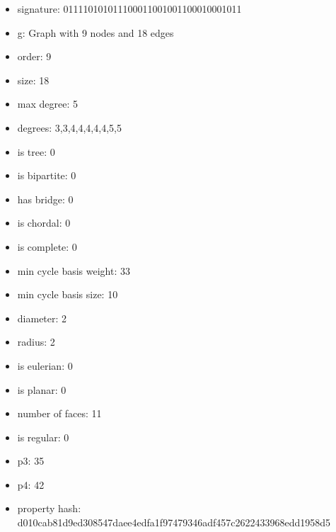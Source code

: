 \newpage
\begin{figure}
\end{figure}
\begin{itemize}
\item signature: 011110101011100011001001100010001011
\item g: Graph with 9 nodes and 18 edges
\item order: 9
\item size: 18
\item max degree: 5
\item degrees: 3,3,4,4,4,4,4,5,5
\item is tree: 0
\item is bipartite: 0
\item has bridge: 0
\item is chordal: 0
\item is complete: 0
\item min cycle basis weight: 33
\item min cycle basis size: 10
\item diameter: 2
\item radius: 2
\item is eulerian: 0
\item is planar: 0
\item number of faces: 11
\item is regular: 0
\item p3: 35
\item p4: 42
\item property hash: d010cab81d9ed308547daee4edfa1f97479346adf457c2622433968edd1958d5
\end{itemize}
